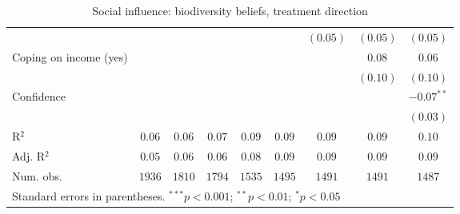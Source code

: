 \begin{table}[h]
\begin{center}
\begin{tabular}{l c c c c c c c c}
                                                             &               &               &               &               &               & $(0.05)$      & $(0.05)$      & $(0.05)$      \\
Coping on income (yes)                                       &               &               &               &               &               &               & $0.08$        & $0.06$        \\
                                                             &               &               &               &               &               &               & $(0.10)$      & $(0.10)$      \\
Confidence                                                   &               &               &               &               &               &               &               & $-0.07^{**}$  \\
                                                             &               &               &               &               &               &               &               & $(0.03)$      \\
\hline
R$^2$                                                        & $0.06$        & $0.06$        & $0.07$        & $0.09$        & $0.09$        & $0.09$        & $0.09$        & $0.10$        \\
Adj. R$^2$                                                   & $0.05$        & $0.06$        & $0.06$        & $0.08$        & $0.09$        & $0.09$        & $0.09$        & $0.09$        \\
Num. obs.                                                    & $1936$        & $1810$        & $1794$        & $1535$        & $1495$        & $1491$        & $1491$        & $1487$        \\
\hline
\multicolumn{9}{l}{\scriptsize{Standard errors in parentheses. $^{***}p<0.001$; $^{**}p<0.01$; $^{*}p<0.05$}}
\end{tabular}
\caption{Social influence: biodiversity beliefs, treatment direction}
\label{table:social_influence_bioemi_treatment_direction}
\end{center}
\end{table}

